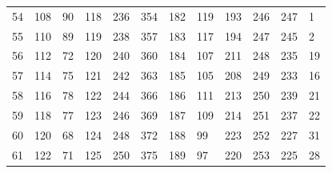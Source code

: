 \begin{table}[]
\begin{tabular}{llllllllllll}
54                     & 108                    & 90                     & 118                    & 236                    & 354                    & 182                    & 119                    & 193                    & 246                    & 247                    & 1                      \\
55                     & 110                    & 89                     & 119                    & 238                    & 357                    & 183                    & 117                    & 194                    & 247                    & 245                    & 2                      \\
56                     & 112                    & 72                     & 120                    & 240                    & 360                    & 184                    & 107                    & 211                    & 248                    & 235                    & 19                     \\
57                     & 114                    & 75                     & 121                    & 242                    & 363                    & 185                    & 105                    & 208                    & 249                    & 233                    & 16                     \\
58                     & 116                    & 78                     & 122                    & 244                    & 366                    & 186                    & 111                    & 213                    & 250                    & 239                    & 21                     \\
59                     & 118                    & 77                     & 123                    & 246                    & 369                    & 187                    & 109                    & 214                    & 251                    & 237                    & 22                     \\
60                     & 120                    & 68                     & 124                    & 248                    & 372                    & 188                    & 99                     & 223                    & 252                    & 227                    & 31                     \\
61                     & 122                    & 71                     & 125                    & 250                    & 375                    & 189                    & 97                     & 220                    & 253                    & 225                    & 28                     \\

\end{tabular}
\end{table}
